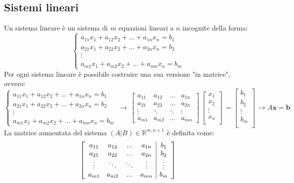 \documentclass{article}
\begin{document}
\vspace{10pt}
\subsection{Sistemi lineari}
    Un sistema lineare è un sistema di $m$ equazioni lineari a $n$ incognite della forma:
    \[
        \begin{cases}
            a_{11}x_1 + a_{12}x_2 + ... + a_{1n}x_n = b_1 \\
            a_{21}x_1 + a_{22}x_2 + ... + a_{2n}x_n = b_2 \\
            \vdots \\
            a_{m1}x_1 + a_{m2}x_2 + ... + a_{mn}x_n = b_m
        \end{cases} 
    \]
    Per ogni sistema lineare è possibile costruire una sua versione "in matrice", ovvero:
    \[
        \begin{cases}
            a_{11}x_1 + a_{12}x_2 + ... + a_{1n}x_n = b_1 \\
            a_{21}x_1 + a_{22}x_2 + ... + a_{2n}x_n = b_2 \\
            \vdots \\
            a_{m1}x_1 + a_{m2}x_2 + ... + a_{mn}x_n = b_m
        \end{cases} 
        \, 
        \rightarrow 
        \,
        \begin{bmatrix}
            a_{11} & a_{12} & ... & a_{1n} \\
            a_{21} & a_{22} & ... & a_{2n} \\
            \vdots & \ddots & \ddots & \vdots \\
            a_{m1} & a_{m2} & ... & a_{mn} 
        \end{bmatrix}
        \,
        \begin{bmatrix}
            x_{1} \\ 
            x_{2} \\
            \vdots \\
            x_{n} \\
        \end{bmatrix}
        \,
        = 
        \begin{bmatrix}
            b_{1} \\ 
            b_{2} \\
            \vdots \\
            b_{m} \\
        \end{bmatrix}
        \,
        \rightarrow
        A\mathbf{x} = \mathbf{b}
    \]
    La matrice aumentata del sistema $(A | B) \in \mathbb{R}^{m, n+1}$ è definita come:
    \[
        \left[
        \begin{array}{cccc | c}
            a_{11} & a_{12} & ... & a_{1n} & b_1 \\
            a_{21} & a_{22} & ... & a_{2n} & b_2 \\
            \vdots & \ddots & \ddots & \vdots & \vdots \\
            a_{m1} & a_{m2} & ... & a_{mn} & b_m 
        \end{array}
        \right]
    \]
\end{document}
